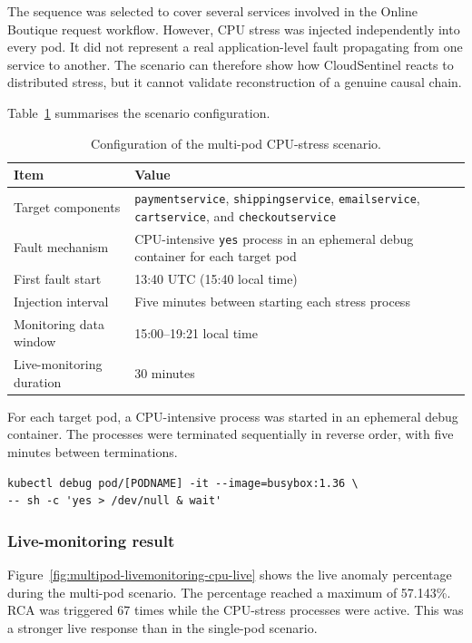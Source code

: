 The sequence was selected to cover several services involved in the Online Boutique request workflow. However, CPU stress was injected independently into every pod. It did not represent a real application-level fault propagating from one service to another. The scenario can therefore show how CloudSentinel reacts to distributed stress, but it cannot validate reconstruction of a genuine causal chain.

Table~\ref{tab:multipod-cpu-setup} summarises the scenario configuration.

\begin{table}[htbp]
    \centering
    \small
    \caption{Configuration of the multi-pod CPU-stress scenario.}
    \label{tab:multipod-cpu-setup}
    \begin{tabular}{l l}
        \toprule
        \textbf{Item} & \textbf{Value} \\
        \midrule
        Target components & \texttt{paymentservice}, \texttt{shippingservice}, \texttt{emailservice}, \texttt{cartservice}, and \texttt{checkoutservice} \\
        Fault mechanism & CPU-intensive \texttt{yes} process in an ephemeral debug container for each target pod \\
        First fault start & 13:40 UTC (15:40 local time) \\
        Injection interval & Five minutes between starting each stress process \\
        Monitoring data window & 15:00--19:21 local time \\
        Live-monitoring duration & 30 minutes \\
        \bottomrule
    \end{tabular}
\end{table}

For each target pod, a CPU-intensive process was started in an ephemeral debug container. The processes were terminated sequentially in reverse order, with five minutes between terminations.

\begin{verbatim}
kubectl debug pod/[PODNAME] -it --image=busybox:1.36 \
-- sh -c 'yes > /dev/null & wait'
\end{verbatim}

\subsubsection{Live-monitoring result}

Figure~\ref{fig:multipod-livemonitoring-cpu-live} shows the live anomaly percentage during the multi-pod scenario. The percentage reached a maximum of 57.143\%. RCA was triggered 67 times while the CPU-stress processes were active. This was a stronger live response than in the single-pod scenario.

